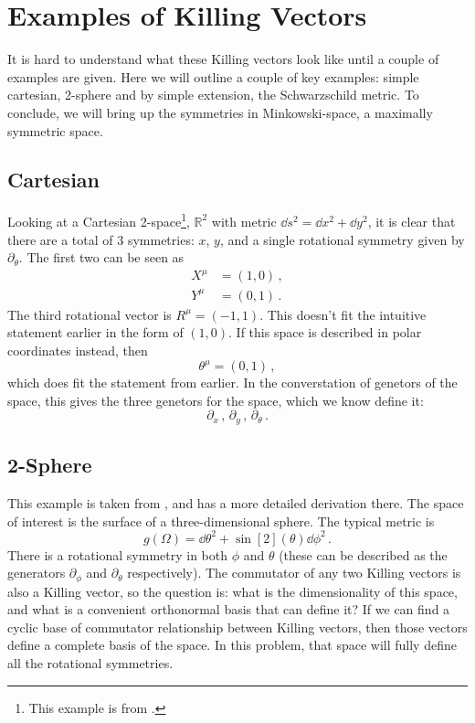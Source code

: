 \documentclass[11pt]{article}
\begin{document}
\section{Examples of Killing Vectors}
It is hard to understand what these Killing vectors look like until a couple of examples are given. Here we will outline a couple of key examples: simple cartesian, 2-sphere and by simple extension, the Schwarzschild metric. To conclude, we will bring up the symmetries in Minkowski-space, a maximally symmetric space.

\subsection{Cartesian}
Looking at a Cartesian 2-space\footnote{This example is from \cite{carroll2005spacetime}.}, $\mathbb{R}^2$ with metric $\dd{s}^2 = \dd{x}^2 + \dd{y}^2$, it is clear that there are a total of 3 symmetries: $x$, $y$, and a single rotational symmetry given by $\partial_\theta$. The first two can be seen as
\begin{align*}
X^\mu & = (1,0) \, ,\\
Y^\mu & = (0,1) \, .
\end{align*}
The third rotational vector is $R^\mu = (-1, 1)$. This doesn't fit the intuitive statement earlier in the form of $(1,0)$. If this space is described in polar coordinates instead, then 
\[\theta^\mu = (0,1) \, ,\]
which does fit the statement from earlier. In the converstation of genetors of the space, this gives the three genetors for the space, which we know define it:
\[\partial_x \, , \, \partial_y \, , \, \partial_\theta \, .\]

\subsection{2-Sphere}
This example is taken from \cite{wiki}, and has a more detailed derivation there. The space of interest is the surface of a three-dimensional sphere. The typical metric is 
\[g(\Omega) = \dd{\theta}^2 + \sin[2](\theta)\dd{\phi}^2 \, .\]
There is a rotational symmetry in both $\phi$ and $\theta$ (these can be described as the generators $\partial_\phi$ and $\partial_\theta$ respectively). The commutator of any two Killing vectors is also a Killing vector, so the question is: what is the dimensionality of this space, and what is a convenient orthonormal basis that can define it? If we can find a cyclic base of commutator relationship between Killing vectors, then those vectors define a complete basis of the space. In this problem, that space will fully define all the rotational symmetries. 
\end{document}
